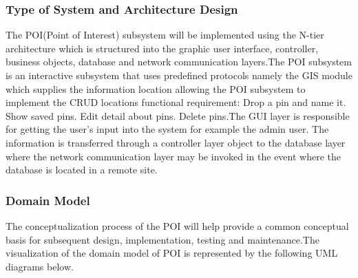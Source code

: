 \documentclass{article}
\begin{document}
 		\subsubsection{Type of System and Architecture Design}
The POI(Point of Interest) subsystem will be implemented using the N-tier architecture which is structured into the graphic user interface, controller, business objects, database and network communication layers.The POI subsystem is an interactive subsystem that uses predeﬁned protocols namely the GIS module which supplies the information location allowing the POI subsystem to implement the CRUD locations functional requirement: Drop a pin and name it. Show saved pins. Edit detail about pins. Delete pins.The GUI layer is responsible for getting the user’s input into the system for example the admin user. The information is transferred through a controller layer object to the database layer where the network communication layer may be invoked in the event where the database is located in a remote site.

		\subsubsection{Domain Model }
The conceptualization process of the POI will help provide a common conceptual basis for subsequent design, implementation, testing and maintenance.The visualization of the domain model of POI is represented by the following UML diagrams below.
\end{document}
